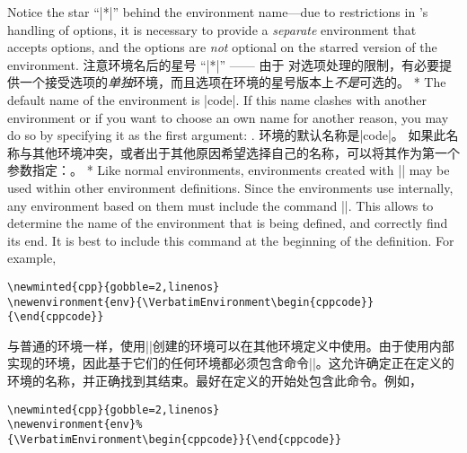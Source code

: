 \begin{paracol}{2}
Notice the star ``|*|'' behind the environment name---due to restrictions in 's handling
of options, it is necessary to provide a \emph{separate} environment that accepts options, and the options
are \emph{not} optional on the starred version of the environment.
\switchcolumn
注意环境名后的星号 ``|*|'' —— 由于  对选项处理的限制，有必要提供一个接受选项的\emph{单独}环境，而且选项在环境的星号版本上\emph{不是}可选的。
\switchcolumn[0]*%
The default name of the environment is |code|.
If this name clashes with another environment or if you want to choose an own name for another reason, you may
do so by specifying it as the first argument: \cmd\newminted{}.
\switchcolumn
环境的默认名称是|code|。
如果此名称与其他环境冲突，或者出于其他原因希望选择自己的名称，可以将其作为第一个参数指定：\cmd\newminted{}。
\switchcolumn[0]*%
Like normal  environments, environments created with |\newminted| may be used within other environment definitions.  Since the  environments use  internally, any environment based on them must include the  command |\VerbatimEnvironment|.  This allows  to determine the name of the environment that is being defined, and correctly find its end.  It is best to include this command at the beginning of the definition.  For example,
\begin{Verbatim}
\newminted{cpp}{gobble=2,linenos}
\newenvironment{env}{\VerbatimEnvironment\begin{cppcode}}{\end{cppcode}}
\end{Verbatim}
\switchcolumn
与普通的环境一样，使用|\newminted|创建的环境可以在其他环境定义中使用。由于使用内部实现的环境，因此基于它们的任何环境都必须包含命令|\VerbatimEnvironment|。这允许确定正在定义的环境的名称，并正确找到其结束。最好在定义的开始处包含此命令。例如，
\begin{Verbatim}
\newminted{cpp}{gobble=2,linenos}
\newenvironment{env}%
{\VerbatimEnvironment\begin{cppcode}}{\end{cppcode}}
\end{Verbatim}
\end{paracol}

